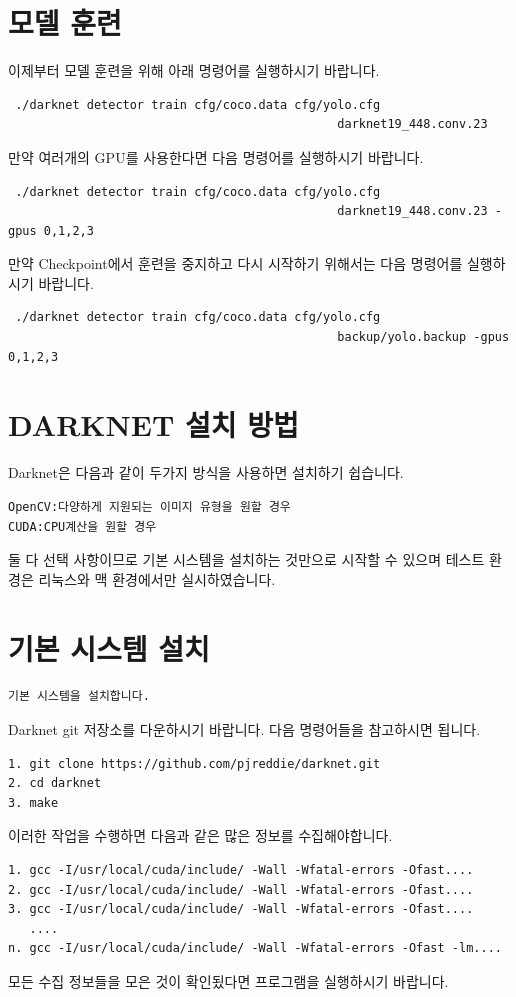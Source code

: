 \documentclass{article}
\begin{document}
\section{모델 훈련}
이제부터 모델 훈련을 위해 아래 명령어를 실행하시기 바랍니다.
\begin{lstlisting}
 ./darknet detector train cfg/coco.data cfg/yolo.cfg 
                                              darknet19_448.conv.23 
\end{lstlisting}
만약 여러개의 GPU를 사용한다면 다음 명령어를 실행하시기 바랍니다.
\begin{lstlisting}
 ./darknet detector train cfg/coco.data cfg/yolo.cfg 
                                              darknet19_448.conv.23 -gpus 0,1,2,3 
\end{lstlisting}
만약 Checkpoint에서 훈련을 중지하고 다시 시작하기 위해서는 다음 명령어를 실행하시기 바랍니다.
\begin{lstlisting}
 ./darknet detector train cfg/coco.data cfg/yolo.cfg 
                                              backup/yolo.backup -gpus 0,1,2,3
\end{lstlisting}


\section{DARKNET 설치 방법}
Darknet은 다음과 같이 두가지 방식을 사용하면 설치하기 쉽습니다.

\begin{verbatim}
OpenCV:다양하게 지원되는 이미지 유형을 원할 경우  
CUDA:CPU계산을 원할 경우
\end{verbatim} 
둘 다 선택 사항이므로 기본 시스템을 설치하는 것만으로 시작할 수 있으며 테스트 환경은 리눅스와 맥 환경에서만 실시하였습니다.

\section{기본 시스템 설치}
\begin{verbatim}
기본 시스템을 설치합니다. 
\end{verbatim}
Darknet git 저장소를  다운하시기 바랍니다. 다음 명령어들을 참고하시면 됩니다.
\begin{verbatim}
1. git clone https://github.com/pjreddie/darknet.git 
2. cd darknet 
3. make 
\end{verbatim}
이러한 작업을 수행하면 다음과 같은 많은 정보를 수집해야합니다.
\begin{verbatim}
1. gcc -I/usr/local/cuda/include/ -Wall -Wfatal-errors -Ofast.... 
2. gcc -I/usr/local/cuda/include/ -Wall -Wfatal-errors -Ofast.... 
3. gcc -I/usr/local/cuda/include/ -Wall -Wfatal-errors -Ofast.... 
   .... 
n. gcc -I/usr/local/cuda/include/ -Wall -Wfatal-errors -Ofast -lm.... 
\end{verbatim}
모든 수집 정보들을 모은 것이 확인됬다면 프로그램을 실행하시기 바랍니다.
\end{document}
